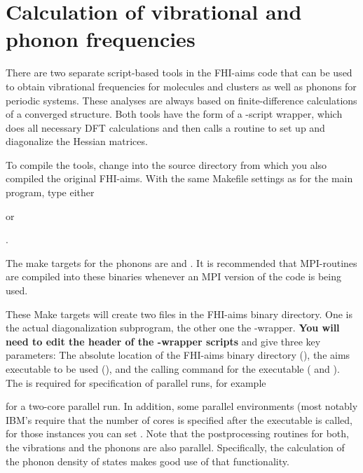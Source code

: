 \section{Calculation of vibrational and phonon frequencies}
\label{Sec:vib}

There are two separate script-based tools in the FHI-aims code that
can be used to obtain vibrational frequencies for molecules and
clusters as well as phonons for periodic systems. These analyses
are always based on finite-difference calculations of a converged
structure. Both tools have the form of a -script wrapper, 
which does all necessary DFT calculations and then calls a routine 
to set up and diagonalize the Hessian matrices.

To compile the tools, change into the source directory from which you
also compiled the original FHI-aims. With the same Makefile settings
as for the main program, type either 


or

.

The make targets for the phonons are  and
. It is recommended that MPI-routines are compiled
into these binaries whenever an MPI version of the code is being
used. 

These Make targets will create two files in the FHI-aims binary
directory. One is the actual diagonalization subprogram, the other one
the -wrapper. \textbf{You will need to edit the header of the
-wrapper scripts} and give three key parameters: The
absolute location of the FHI-aims binary directory
(), the aims executable to be used
(), and the calling command for the executable 
( and ).
The  is required for specification of
parallel runs, for example 


for a two-core parallel run. In addition, some parallel environments
(most notably IBM's  require that the number of cores is
specified after the executable is called, for those instances you can
set . Note that the postprocessing routines
for both, the vibrations and the phonons are also
parallel. Specifically, the calculation of the phonon density of
states makes good use of that functionality. 

